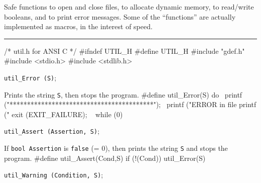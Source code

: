 
Safe functions to open and close files, to allocate dynamic memory,
to read/write booleans, and to print error messages.
Some of the ``functions'' are actually implemented as macros, in the
interest of speed.

\bigskip\hrule
\code\hide
/* util.h  for ANSI C */
#ifndef UTIL_H
#define UTIL_H
\endhide
#include "gdef.h"
#include <stdio.h>
#include <stdlib.h>
\endcode





\noindent
{\tt util\_Error (S)};

 \tab  Prints the string {\tt S}, then stops the program.
 \endtab
\code
\hide
#define util_Error(S) do { \
   printf ("\n\n******************************************\n"); \
   printf ("ERROR in file %
   printf ("%
   exit (EXIT_FAILURE); \
   } while (0)
\endhide
\endcode

\noindent
{\tt util\_Assert (Assertion, S)};

 \tab  If {\tt bool Assertion} is {\tt false} (= 0),
  then prints the string {\tt S} and stops the program.
 \endtab
\code
\hide
#define util_Assert(Cond,S) if (!(Cond)) util_Error(S)
\endhide
\endcode

\noindent
{\tt util\_Warning (Condition, S)};

